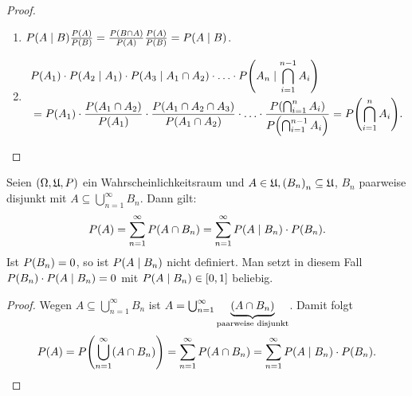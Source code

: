 \documentclass{lecture}
\begin{document}
    \begin{proof}
        \begin{enumerate}
            \item \(P\parentheses*{A \mid B}\frac{P\parentheses*{A}}{P\parentheses*{B}} = \frac{P\parentheses*{B \cap A}}{P\parentheses*{A}}\frac{P\parentheses*{A}}{P\parentheses*{B}} = P\parentheses*{A \mid B}\).
            \item
            \begin{align*}
                &P\parentheses*{A_1} \cdot P\parentheses*{A_2 \mid A_1} \cdot P\parentheses*{A_3 \mid A_1 \cap A_2} \cdot \ldots \cdot P\parentheses*{A_n \mid \bigcap_{i = 1}^{n - 1}A_i}\\
                &= P\parentheses*{A_1} \cdot \frac{P\parentheses*{A_1 \cap A_2}}{P\parentheses*{A_1}} \cdot \frac{P\parentheses*{A_1 \cap A_2 \cap A_3}}{P\parentheses*{A_1 \cap A_2}} \cdot \ldots \cdot \frac{P\parentheses*{\bigcap_{i = 1}^n A_i}}{P\parentheses*{\bigcap_{i = 1}^{n - 1} A_i}} = P\parentheses*{\bigcap_{i = 1}^n A_i}.
            \end{align*}
        \end{enumerate}
    \end{proof}

    \begin{lemma}
        Seien \(\parentheses*{\Omega, \mathfrak{U}, P}\) ein Wahrscheinlichkeitsraum und \(A \in \mathfrak{U}, \parentheses*{B_n}_n \subseteq \mathfrak{U}\), \(B_n\) paarweise disjunkt mit \(A \subseteq \bigcup_{n = 1}^\infty B_n\).
        Dann gilt:
        \[
            P\parentheses*{A} = \sum_{n = 1}^\infty P\parentheses*{A \cap B_n} = \sum_{n = 1}^\infty P\parentheses*{A \mid B_n} \cdot P\parentheses*{B_n}.
        \]
        Ist \(P\parentheses*{B_n} = 0\), so ist \(P\parentheses*{A \mid B_n}\) nicht definiert.
        Man setzt in diesem Fall \(P\parentheses*{B_n} \cdot P\parentheses*{A \mid B_n} = 0\) mit \(P\parentheses*{A \mid B_n} \in \brackets*{0, 1}\) beliebig.
    \end{lemma}

    \begin{proof}
        Wegen \(A \subseteq \bigcup_{n = 1}^\infty B_n\) ist \(A = \bigcup_{n = 1}^\infty \underbrace{\parentheses*{A \cap B_n}}_{\text{paarweise disjunkt}}\).
        Damit folgt
        \[
            P\parentheses*{A} = P\parentheses*{\bigcup_{n = 1}^\infty\parentheses*{A \cap B_n}} = \sum_{n = 1}^\infty P\parentheses*{A \cap B_n} = \sum_{n = 1}^\infty P\parentheses*{A \mid B_n} \cdot P\parentheses*{B_n}.
        \]
    \end{proof}
\end{document}
